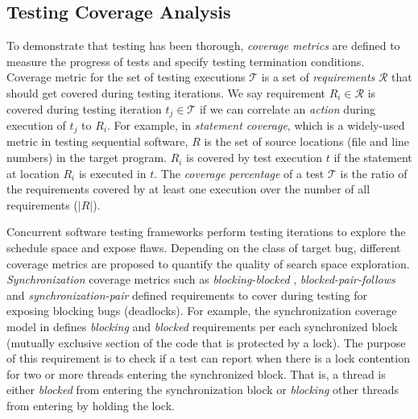 \subsection{Testing Coverage Analysis}
\label{sec:coverage}
To demonstrate that testing has been thorough, \textit{coverage metrics} are defined to measure the progress of tests and specify testing termination conditions.
%
Coverage metric for the set of testing executions $\mathcal{T}$ is a set of \textit{requirements} $\mathcal{R}$ that should get covered during testing iterations.
%
We say requirement $R_i \in \mathcal{R}$ is covered during testing iteration $t_j \in \mathcal{T}$ if we can correlate an \textit{action} during execution of $t_j$ to $R_i$.
%
For example, in \textit{statement coverage}, which is a widely-used metric in testing sequential software, $R$ is the set of source locations (file and line numbers) in the target program.
%
$R_i$ is covered by test execution $t$ if the statement at location $R_i$ is executed in $t$.
%
The \textit{coverage percentage} of a test $\mathcal{T}$ is the ratio of the requirements covered by at least one execution over the number of all requirements ($|R|$).

Concurrent software testing frameworks perform testing iterations to explore the schedule space and expose flaws.
%
Depending on the class of target bug, different coverage metrics are proposed to quantify the quality of search space exploration.
%
\textit{Synchronization} coverage metrics such as \textit{blocking-blocked} \cite{edelstein2003contest}, \textit{blocked-pair-follows} \cite{trainin-followsCoverage-padtad09} and \textit{synchronization-pair} \cite{hong-syncTesting-issta12} defined requirements to cover during testing for exposing blocking bugs (\eg deadlocks).
%
%
For example, the synchronization coverage model in \cite{edelstein2003contest} defines \textit{blocking} and \textit{blocked} requirements per each synchronized block (\ie mutually exclusive section of the code that is protected by a lock).
%
The purpose of this requirement is to check if a test can report when there is a lock contention for two or more threads entering the synchronized block.
%
That is, a thread is either \textit{blocked} from entering the synchronization block or \textit{blocking} other threads from entering by holding the lock.
%

